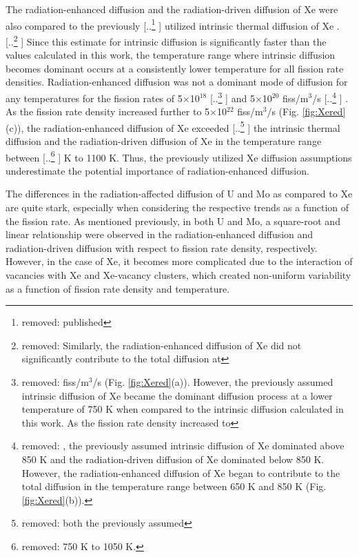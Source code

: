 \documentclass[preprint,12pt]{elsarticle}
\providecommand{\DIFadd}[1]{{\protect\color{blue} \sf #1}} %
\providecommand{\DIFdel}[1]{{\protect\color{red} [..\footnote{removed: #1} ]}} %
\providecommand{\DIFaddbegin}{} %
\providecommand{\DIFaddend}{} %
\providecommand{\DIFdelbegin}{} %
\providecommand{\DIFdelend}{} %
\newcommand{\DIFscaledelfig}{0.5}
\newlength{\DIFdelgraphicswidth} %
\newlength{\DIFdelgraphicsheight} %
\newcommand{\DIFaddincludegraphics}[2][]{{\color{blue}\fbox{\DIFOincludegraphics[#1]{#2}}}} %
\newcommand{\DIFdelincludegraphics}[2][]{%
\sbox{\DIFdelgraphicsbox}{\DIFOincludegraphics[#1]{#2}}%
\settoboxwidth{\DIFdelgraphicswidth}{\DIFdelgraphicsbox} %
\settoboxtotalheight{\DIFdelgraphicsheight}{\DIFdelgraphicsbox} %
\scalebox{\DIFscaledelfig}{%
\parbox[b]{\DIFdelgraphicswidth}{\usebox{\DIFdelgraphicsbox}\\[-\baselineskip] \rule{\DIFdelgraphicswidth}{0em}}\llap{\resizebox{\DIFdelgraphicswidth}{\DIFdelgraphicsheight}{%
\setlength{\unitlength}{\DIFdelgraphicswidth}%
\begin{picture}(1,1)%
\thicklines\linethickness{2pt} %
{\color[rgb]{1,0,0}\put(0,0){\framebox(1,1){}}}%
{\color[rgb]{1,0,0}\put(0,0){\line( 1,1){1}}}%
{\color[rgb]{1,0,0}\put(0,1){\line(1,-1){1}}}%
\end{picture}%
}\hspace*{3pt}}} %
} %
\DeclareRobustCommand{\DIFaddbegin}{\DIFOaddbegin \let\includegraphics\DIFaddincludegraphics} %
\DeclareRobustCommand{\DIFaddend}{\DIFOaddend \let\includegraphics\DIFOincludegraphics} %
\DeclareRobustCommand{\DIFdelbegin}{\DIFOdelbegin \let\includegraphics\DIFdelincludegraphics} %
\DeclareRobustCommand{\DIFdelend}{\DIFOaddend \let\includegraphics\DIFOincludegraphics} %
\begin{document}
\indent The radiation-enhanced diffusion and the radiation-driven diffusion of Xe were also compared to the previously \DIFdelbegin \DIFdel{published }\DIFdelend \DIFaddbegin \DIFadd{utilized }\DIFaddend intrinsic thermal diffusion of Xe \cite{hu2016microstructural, Beeler2018microstructural}. \DIFdelbegin \DIFdel{Similarly, the radiation-enhanced diffusion of Xe did not significantly contribute to the total diffusion at }\DIFdelend \DIFaddbegin \DIFadd{Since this estimate for intrinsic diffusion is significantly faster than the values calculated in this work, the temperature range where intrinsic diffusion becomes dominant occurs at a consistently lower temperature for all fission rate densities. Radiation-enhanced diffusion was not a dominant mode of diffusion for any temperatures for the fission rates of }\DIFaddend 5$\times$10$^{18}$ \DIFdelbegin \DIFdel{fiss/m$^{3}$/s (Fig. \ref{fig:Xered}(a)). However, the previously assumed intrinsic diffusion of Xe became the dominant diffusion process at a lower temperature of 750 K when compared to the intrinsic diffusion calculated in this work. As the fission rate density increased to }\DIFdelend \DIFaddbegin \DIFadd{and }\DIFaddend 5$\times$10$^{20}$ fiss/m$^{3}$/s\DIFdelbegin \DIFdel{, the previously assumed intrinsic diffusion of Xe dominated above 850 K and the radiation-driven diffusion of Xe dominated below 850 K. However, the radiation-enhanced diffusion of Xe began to contribute to the total diffusion in the temperature range between 650 K and 850 K (Fig. \ref{fig:Xered}(b)). }\DIFdelend \DIFaddbegin \DIFadd{. }\DIFaddend As the fission rate density increased further to 5$\times$10$^{22}$ fiss/m$^{3}$/s (Fig. \ref{fig:Xered}(c)), the radiation-enhanced diffusion of Xe exceeded \DIFdelbegin \DIFdel{both the previously assumed }\DIFdelend \DIFaddbegin \DIFadd{the }\DIFaddend intrinsic thermal diffusion and the radiation-driven diffusion of Xe in the temperature range between \DIFdelbegin \DIFdel{750 K to 1050 K. }%
\DIFdelend \DIFaddbegin \DIFadd{700 K to 1100 K. Thus, the previously utilized Xe diffusion assumptions underestimate the potential importance of radiation-enhanced diffusion. 
}

\DIFaddend \indent The differences in the radiation-affected diffusion of U and Mo as compared to Xe are quite stark, especially when considering the respective trends as a function of \DIFaddbegin \DIFadd{the }\DIFaddend fission rate. As mentioned previously, in both U and Mo, a square-root and linear relationship were observed in the radiation-enhanced diffusion and radiation-driven diffusion with respect to fission rate density, respectively. However, in the case of Xe, it becomes more complicated due to the interaction of vacancies with Xe and Xe-vacancy clusters, which created non-uniform variability as a function of fission rate density and temperature. 
\\
\end{document}
